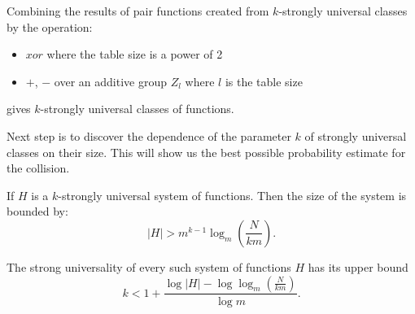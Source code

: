 \begin{corollary}
Combining the results of pair functions created from $k$-strongly universal classes by the operation:
\begin{itemize}
\item $xor$ where the table size is a power of 2
\item $+$, $-$ over an additive group $Z_l$ where $l$ is the table size
\end{itemize}
gives $k$-strongly universal classes of functions.
\end{corollary}

Next step is to discover the dependence of the parameter $k$ of strongly universal classes on their size. This will show us the best possible probability estimate for the collision.
\begin{theorem}
If $H$ is a $k$-strongly universal system of functions. Then the size of the system is bounded by:
\begin{displaymath}
|H| > m^{k - 1} \log_m \left( \frac{N}{km} \right) \textit{.}
\end{displaymath}

The strong universality of every such system of functions $H$ has its upper bound
\begin{displaymath}
k < 1 + \frac{\log |H| - \log \log_m \left( \frac{N}{km} \right)}{\log m} \textit{.}
\end{displaymath}
\end{theorem}
